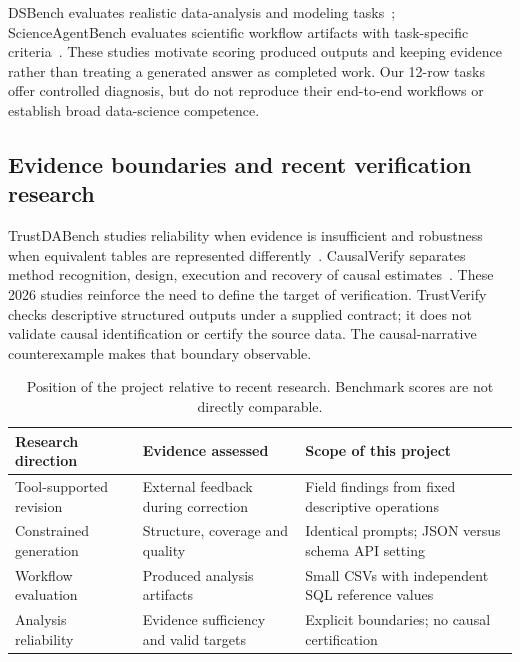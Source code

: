 DSBench evaluates realistic data-analysis and modeling tasks~\cite{jing2025dsbench}; ScienceAgentBench evaluates scientific workflow artifacts with task-specific criteria~\cite{chen2025scienceagent}. These studies motivate scoring produced outputs and keeping evidence rather than treating a generated answer as completed work. Our 12-row tasks offer controlled diagnosis, but do not reproduce their end-to-end workflows or establish broad data-science competence.

\subsection{Evidence boundaries and recent verification research}
TrustDABench studies reliability when evidence is insufficient and robustness when equivalent tables are represented differently~\cite{shi2026trustda}. CausalVerify separates method recognition, design, execution and recovery of causal estimates~\cite{zhang2026causalverify}. These 2026 studies reinforce the need to define the target of verification. TrustVerify checks descriptive structured outputs under a supplied contract; it does not validate causal identification or certify the source data. The causal-narrative counterexample makes that boundary observable.

\begin{table}[!htbp]\centering\small
\caption{Position of the project relative to recent research. Benchmark scores are not directly comparable.}
\label{tab:position}
\begin{tabular}{@{}p{3.8cm}p{4.7cm}p{6.4cm}@{}}\toprule
Research direction & Evidence assessed & Scope of this project\\\midrule
Tool-supported revision~\cite{gou2024critic} & External feedback during correction & Field findings from fixed descriptive operations\\
Constrained generation~\cite{geng2025jsonschema} & Structure, coverage and quality & Identical prompts; JSON versus schema API setting\\
Workflow evaluation~\cite{jing2025dsbench,chen2025scienceagent} & Produced analysis artifacts & Small CSVs with independent SQL reference values\\
Analysis reliability~\cite{shi2026trustda,zhang2026causalverify} & Evidence sufficiency and valid targets & Explicit boundaries; no causal certification\\\bottomrule
\end{tabular}
\end{table}

